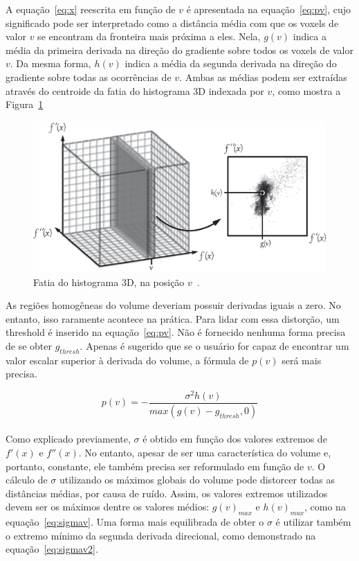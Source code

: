 	A equação~\eqref{eq:x} reescrita em função de $v$ é apresentada na equação~\eqref{eq:pv}, cujo significado pode ser interpretado como a distância média com que os voxels de valor $v$ se encontram da fronteira mais próxima a eles. Nela, $g(v)$ indica a média da primeira derivada na direção do gradiente sobre todos os voxels de valor $v$. Da mesma forma, $h(v)$ indica a média da segunda derivada na direção do gradiente sobre todas as ocorrências de $v$. Ambas as médias podem ser extraídas através do centroide da fatia do histograma 3D indexada por $ v $, como mostra a Figura~\ref{fig:g_hv}
	
\begin{figure}[h]
	\centering
	\includegraphics[width=1\textwidth]{images/g_hv}
	\caption{Fatia do histograma 3D, na posição $ v $~\cite{gordonms}.}
	\label{fig:g_hv}
\end{figure}

	As regiões homogêneas do volume deveriam possuir derivadas iguais a zero. No entanto, isso raramente acontece na prática. Para lidar com essa distorção, um threshold é inserido na equação~\eqref{eq:pv}. Não é fornecido nenhuma forma precisa de se obter $ g_{thresh} $. Apenas é sugerido que se o usuário for capaz de encontrar um valor escalar superior à derivada  do volume, a fórmula de $ p(v) $ será mais precisa.

\begin{equation} \label{eq:pv}
	p(v) = -\frac{\sigma^{2}h(v)}{max(g(v) - g_{thresh}, 0)}
\end{equation} \\

	Como explicado previamente, $\sigma$ é obtido em função dos valores extremos de $f'(x)$ e $f''(x)$. No entanto, apesar de ser uma característica do volume e, portanto, constante, ele também precisa ser reformulado em função de $v$. O cálculo de $\sigma$ utilizando os máximos globais do volume pode distorcer todas as distâncias médias, por causa de ruído. Assim, os valores extremos utilizados devem ser os máximos dentre os valores médios: $g(v)_{max}$ e $h(v)_{max}$, como na equação~\eqref{eq:sigmav}. Uma forma mais equilibrada de obter o $\sigma$ é utilizar também o extremo mínimo da segunda derivada direcional, como demonstrado na equação~\eqref{eq:sigmav2}. \\
	
